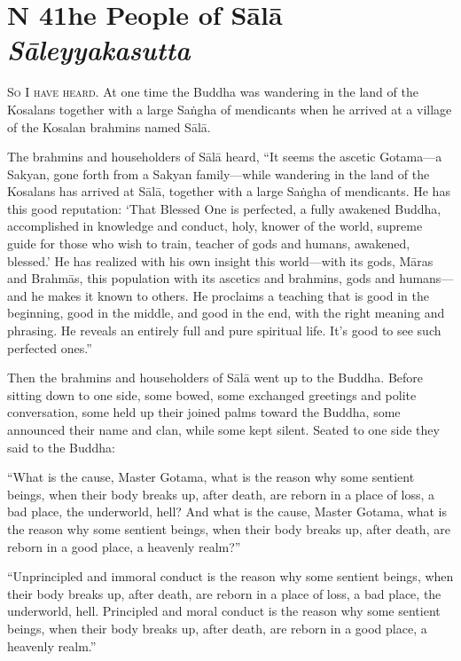 \documentclass[12pt,openany]{book}%
\newcommand*{\suttatitleacronym}[1]{\smaller[2]{#1}\vspace*{.3em}}
\newcommand*{\suttatitletranslation}[1]{\linebreak{#1}}
\newcommand*{\suttatitleroot}[1]{\linebreak\smaller[2]\itshape{#1}}
\newcommand*{\tocacronym}[1]{\hspace*{-3.3em}{#1}\quad}
\newcommand*{\toctranslation}[1]{#1}
\newcommand*{\tocroot}[1]{(\textit{#1})}
\newcommand*{\scevam}[1]{\textsc{#1}}
\begin{document}
%
\section*{{\suttatitleacronym MN 41}{\suttatitletranslation The People of Sālā }{\suttatitleroot Sāleyyakasutta}}
\addcontentsline{toc}{section}{\tocacronym{MN 41} \toctranslation{The People of Sālā } \tocroot{Sāleyyakasutta}}

\scevam{So I have heard. }At one time the Buddha was wandering in the land of the Kosalans together with a large \textsanskrit{Saṅgha} of mendicants when he arrived at a village of the Kosalan brahmins named \textsanskrit{Sālā}. 

The brahmins and householders of \textsanskrit{Sālā} heard, “It seems the ascetic Gotama—a Sakyan, gone forth from a Sakyan family—while wandering in the land of the Kosalans has arrived at \textsanskrit{Sālā}, together with a large \textsanskrit{Saṅgha} of mendicants. He has this good reputation: ‘That Blessed One is perfected, a fully awakened Buddha, accomplished in knowledge and conduct, holy, knower of the world, supreme guide for those who wish to train, teacher of gods and humans, awakened, blessed.’ He has realized with his own insight this world—with its gods, \textsanskrit{Māras} and \textsanskrit{Brahmās}, this population with its ascetics and brahmins, gods and humans—and he makes it known to others. He proclaims a teaching that is good in the beginning, good in the middle, and good in the end, with the right meaning and phrasing. He reveals an entirely full and pure spiritual life. It’s good to see such perfected ones.” 

Then the brahmins and householders of \textsanskrit{Sālā} went up to the Buddha. Before sitting down to one side, some bowed, some exchanged greetings and polite conversation, some held up their joined palms toward the Buddha, some announced their name and clan, while some kept silent. Seated to one side they said to the Buddha: 

“What is the cause, Master Gotama, what is the reason why some sentient beings, when their body breaks up, after death, are reborn in a place of loss, a bad place, the underworld, hell? And what is the cause, Master Gotama, what is the reason why some sentient beings, when their body breaks up, after death, are reborn in a good place, a heavenly realm?” 

“Unprincipled and immoral conduct is the reason why some sentient beings, when their body breaks up, after death, are reborn in a place of loss, a bad place, the underworld, hell. Principled and moral conduct is the reason why some sentient beings, when their body breaks up, after death, are reborn in a good place, a heavenly realm.” 
\end{document}
